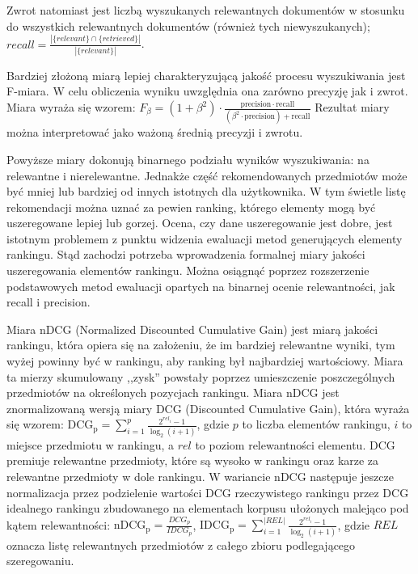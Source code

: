 \documentclass[pl]{minipw} %
\begin{document}
Zwrot natomiast jest liczbą wyszukanych relewantnych dokumentów w stosunku do wszystkich relewantnych dokumentów (również tych niewyszukanych); $recall=\frac{|\{relevant\} \cap \{retrieved\}|}{|\{relevant\}|}$.

Bardziej złożoną miarą lepiej charakteryzującą jakość procesu wyszukiwania jest F-miara. W celu obliczenia wyniku uwzględnia ona zarówno precyzję jak i zwrot. Miara wyraża się wzorem: $F_\beta = (1 + \beta^2) \cdot \frac{\mathrm{precision} \cdot \mathrm{recall}}{(\beta^2 \cdot \mathrm{precision}) + \mathrm{recall}}$ Rezultat miary można interpretować jako ważoną średnią precyzji i zwrotu. 

Powyższe miary dokonują binarnego podziału wyników wyszukiwania: na relewantne i nierelewantne. Jednakże część rekomendowanych przedmiotów może być mniej lub bardziej od innych istotnych dla użytkownika. W tym świetle listę rekomendacji można uznać za pewien ranking, którego elementy mogą być uszeregowane lepiej lub gorzej. Ocena, czy dane uszeregowanie jest dobre, jest istotnym problemem z punktu widzenia ewaluacji metod generujących elementy rankingu. Stąd zachodzi potrzeba wprowadzenia formalnej miary jakości uszeregowania elementów rankingu. Można osiągnąć poprzez rozszerzenie podstawowych metod ewaluacji opartych na binarnej ocenie relewantności, jak recall i precision.

Miara nDCG \cite{ndcg} (Normalized Discounted Cumulative Gain) jest miarą jakości rankingu, która opiera się na założeniu, że im bardziej relewantne wyniki, tym wyżej powinny być w rankingu, aby ranking był najbardziej wartościowy. Miara ta mierzy skumulowany ,,zysk'' powstały poprzez umieszczenie poszczególnych przedmiotów na określonych pozycjach rankingu. Miara nDCG jest znormalizowaną wersją miary DCG (Discounted Cumulative Gain), która wyraża się wzorem: ${\mathrm  {DCG_{{p}}}}=\sum _{{i=1}}^{{p}}{\frac  {2^{{rel_{{i}}}}-1}{\log _{{2}}(i+1)}}$, gdzie $p$ to liczba elementów rankingu, $i$ to miejsce przedmiotu w rankingu, a $rel$ to poziom relewantności elementu. DCG premiuje relewantne przedmioty, które są wysoko w rankingu oraz karze za relewantne przedmioty w dole rankingu. W wariancie nDCG następuje jeszcze normalizacja przez podzielenie wartości DCG rzeczywistego rankingu przez DCG idealnego rankingu zbudowanego na elementach korpusu ułożonych malejąco pod kątem relewantności: ${\mathrm  {nDCG_{{p}}}}={\frac  {DCG_{{p}}}{IDCG_{{p}}}}$, $\mathrm {IDCG_{p}} =\sum _{i=1}^{|REL|}{\frac {2^{rel_{i}}-1}{\log _{2}(i+1)}}$, gdzie $REL$ oznacza listę relewantnych przedmiotów z całego zbioru podlegającego szeregowaniu.
\end{document}
